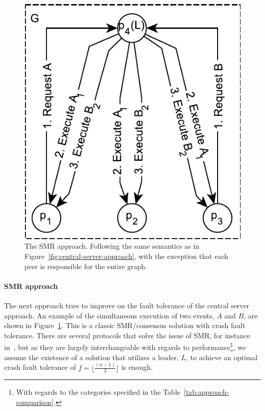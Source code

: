 \documentclass{article}
\begin{document}
    \FloatBarrier
    \begin{figure}[ht!]
        \center
        \includegraphics[scale=0.7]{figures/dcr-graphs/smr-approach.pdf}
        \caption{The SMR approach.
        Following the same semantics as in Figure~\ref{fig:central-server-approach}, with the exception that each peer is responsible for the entire graph.}
        \label{fig:smr-approach}
    \end{figure}
    \FloatBarrier

	\paragraph{SMR approach}
	The next approach tries to improve on the fault tolerance of the central server approach.
    An example of the simultaneous execution of two events, $A$ and $B$, are shown in Figure~\ref{fig:smr-approach}.
	This is a classic SMR/consensus solution with crash fault tolerance.
	There are several protocols that solve the issue of SMR, for instance in~\cite{bracha_asynchronous_1985,lamport_part-time_1998,lamport_lower_2006,ongaro_search_2014}, but as they are largely interchangeable with regards to performance\footnote{With regards to the categories specified in the Table~\ref{tab:approach-comparison}.}, we assume the existence of a solution that utilizes a leader, $L$, to achieve an optimal crash fault tolerance of $f = \lfloor \frac{(n-1)}{2} \rfloor$ is enough. %
\end{document}
